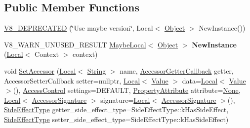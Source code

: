 \subsection*{Public Member Functions}
\begin{DoxyCompactItemize}
\item 
\mbox{\hyperlink{classv8_1_1ObjectTemplate_ab13f4f7e5f31fc037f7a72cfbf89443d}{V8\+\_\+\+D\+E\+P\+R\+E\+C\+A\+T\+ED}} (\char`\"{}Use maybe version\char`\"{}, Local$<$ \mbox{\hyperlink{classv8_1_1Object}{Object}} $>$ New\+Instance())
\item 
\mbox{\label{classv8_1_1ObjectTemplate_a76c118a457f70ec9ec24cf24985655ff}} 
V8\+\_\+\+W\+A\+R\+N\+\_\+\+U\+N\+U\+S\+E\+D\+\_\+\+R\+E\+S\+U\+LT \mbox{\hyperlink{classv8_1_1MaybeLocal}{Maybe\+Local}}$<$ \mbox{\hyperlink{classv8_1_1Object}{Object}} $>$ {\bfseries New\+Instance} (\mbox{\hyperlink{classv8_1_1Local}{Local}}$<$ Context $>$ context)
\item 
void \mbox{\hyperlink{classv8_1_1ObjectTemplate_a5a99dc7b4895ad486430a4ba6c294136}{Set\+Accessor}} (\mbox{\hyperlink{classv8_1_1Local}{Local}}$<$ \mbox{\hyperlink{classv8_1_1String}{String}} $>$ name, \mbox{\hyperlink{namespacev8_a722613c87061708a4f1aa050d095f868}{Accessor\+Getter\+Callback}} getter, Accessor\+Setter\+Callback setter=nullptr, \mbox{\hyperlink{classv8_1_1Local}{Local}}$<$ \mbox{\hyperlink{classv8_1_1Value}{Value}} $>$ data=\mbox{\hyperlink{classv8_1_1Local}{Local}}$<$ \mbox{\hyperlink{classv8_1_1Value}{Value}} $>$(), \mbox{\hyperlink{namespacev8_a31d8355cb043d7d2dda3f4a52760b64e}{Access\+Control}} settings=D\+E\+F\+A\+U\+LT, \mbox{\hyperlink{namespacev8_a05f25f935e108a1ea2d150e274602b87}{Property\+Attribute}} attribute=\mbox{\hyperlink{namespacev8_a05f25f935e108a1ea2d150e274602b87a7ab4d58719c33b3ea2dfaefa29b111df}{None}}, \mbox{\hyperlink{classv8_1_1Local}{Local}}$<$ \mbox{\hyperlink{classv8_1_1AccessorSignature}{Accessor\+Signature}} $>$ signature=\mbox{\hyperlink{classv8_1_1Local}{Local}}$<$ \mbox{\hyperlink{classv8_1_1AccessorSignature}{Accessor\+Signature}} $>$(), \mbox{\hyperlink{namespacev8_a29711319c2b9fc7716d65faee2f7b9cb}{Side\+Effect\+Type}} getter\+\_\+side\+\_\+effect\+\_\+type=Side\+Effect\+Type\+::k\+Has\+Side\+Effect, \mbox{\hyperlink{namespacev8_a29711319c2b9fc7716d65faee2f7b9cb}{Side\+Effect\+Type}} setter\+\_\+side\+\_\+effect\+\_\+type=Side\+Effect\+Type\+::k\+Has\+Side\+Effect)
\item 
\mbox{\label{classv8_1_1ObjectTemplate_ab96a8fcd960c3f5ff358cf1ae2b0b09a}} 

\end{DoxyCompactItemize}
